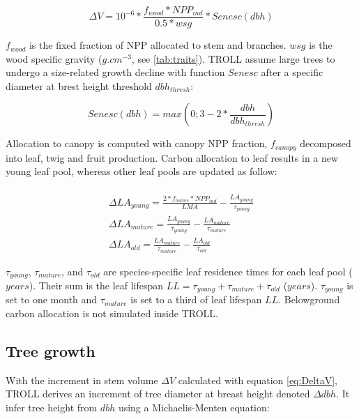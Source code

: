 \documentclass[12pt,]{article}
\theoremstyle{definition}
\theoremstyle{definition}
\theoremstyle{definition}
\theoremstyle{remark}
\begin{document}
\begin{equation}
  \Delta V = 10^{-6} * \frac{f_{wood}*NPP_{ind}}{0.5*wsg}*Senesc(dbh)
  \label{eq:DeltaV}
\end{equation}

\(f_{wood}\) is the fixed fraction of NPP allocated to stem and
branches. \(wsg\) is the wood specific gravity (\(g.cm^{-3}\), see
\ref{tab:traits}). TROLL assume large trees to undergo a size-related
growth decline with function \(Senesc\) after a specific diameter at
brest height threshold \(dbh_{thresh}\):

\begin{equation}
  Senesc(dbh) = max(0;3-2*\frac{dbh}{dbh_{thresh}})
  \label{eq:Senesc}
\end{equation}

Allocation to canopy is computed with canopy NPP fraction,
\(f_{canopy}\) decomposed into leaf, twig and fruit production. Carbon
allocation to leaf results in a new young leaf pool, whereas other leaf
pools are updated as follow:

\begin{equation}
  \begin{array}{c} \\
   \Delta LA_{young} = \frac{2*f_{leaves}*NPP_{ind}}{LMA}-\frac{LA_{young}}{\tau_{young}} \\
  \Delta LA_{mature} = \frac{LA_{young}}{\tau_{young}} - \frac{LA_{mature}}{\tau_{mature}}\\
  \Delta LA_{old} = \frac{LA_{mature}}{\tau_{mature}} - \frac{LA_{old}}{\tau_{old}}
  \end{array}
  \label{eq:DeltaLA}
\end{equation}

\(\tau_{young}\), \(\tau_{mature}\), and \(\tau_{old}\) are
species-specific leaf residence times for each leaf pool (\(years\)).
Their sum is the leaf lifespan
\(LL = \tau_{young} + \tau_{mature} + \tau_{old}\) (\(years\)).
\(\tau_{young}\) is set to one month and \(\tau_{mature}\) is set to a
third of leaf lifespan \(LL\). Belowground carbon allocation is not
simulated inside TROLL.

\subsection{Tree growth}\label{tree-growth}

With the increment in stem volume \(\Delta V\) calculated with equation
\eqref{eq:DeltaV}, TROLL derives an increment of tree diameter at breast
height denoted \(\Delta dbh\). It infer tree height from \(dbh\) using a
Michaelis-Menten equation:
\end{document}
